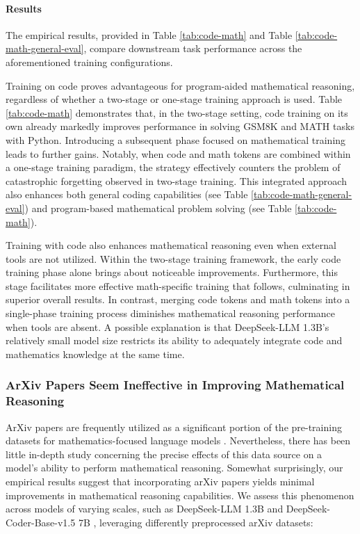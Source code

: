 \begin{itemize}[topsep=0pt]
\paragraph{Results}
The empirical results, provided in Table \ref{tab:code-math} and Table \ref{tab:code-math-general-eval}, compare downstream task performance across the aforementioned training configurations.

Training on code proves advantageous for program-aided mathematical reasoning, regardless of whether a two-stage or one-stage training approach is used. Table \ref{tab:code-math} demonstrates that, in the two-stage setting, code training on its own already markedly improves performance in solving GSM8K and MATH tasks with Python. Introducing a subsequent phase focused on mathematical training leads to further gains. Notably, when code and math tokens are combined within a one-stage training paradigm, the strategy effectively counters the problem of catastrophic forgetting observed in two-stage training. This integrated approach also enhances both general coding capabilities (see Table \ref{tab:code-math-general-eval}) and program-based mathematical problem solving (see Table \ref{tab:code-math}).

Training with code also enhances mathematical reasoning even when external tools are not utilized. Within the two-stage training framework, the early code training phase alone brings about noticeable improvements. Furthermore, this stage facilitates more effective math-specific training that follows, culminating in superior overall results. In contrast, merging code tokens and math tokens into a single-phase training process diminishes mathematical reasoning performance when tools are absent. A possible explanation is that DeepSeek-LLM 1.3B’s relatively small model size restricts its ability to adequately integrate code and mathematics knowledge at the same time.

\subsubsection{ArXiv Papers Seem Ineffective in Improving Mathematical Reasoning}

ArXiv papers are frequently utilized as a significant portion of the pre-training datasets for mathematics-focused language models \citep{minerva,gpt-f,llemma,mathpile}. Nevertheless, there has been little in-depth study concerning the precise effects of this data source on a model’s ability to perform mathematical reasoning. Somewhat surprisingly, our empirical results suggest that incorporating arXiv papers yields minimal improvements in mathematical reasoning capabilities. We assess this phenomenon across models of varying scales, such as DeepSeek-LLM 1.3B and DeepSeek-Coder-Base-v1.5 7B \citep{deepseek-coder}, leveraging differently preprocessed arXiv datasets:


\end{itemize}
